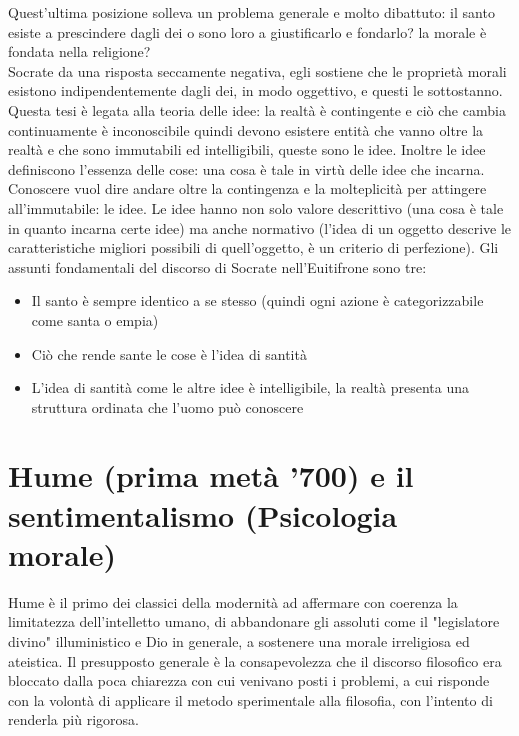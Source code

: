 \documentclass[10pt,a4paper]{article}
\begin{document}
Quest'ultima posizione solleva un problema generale e molto dibattuto: il santo esiste a prescindere dagli dei o sono loro a giustificarlo e fondarlo? la morale è fondata nella religione?\\
Socrate da una risposta seccamente negativa, egli sostiene che le proprietà morali esistono indipendentemente dagli dei, in modo oggettivo, e questi le sottostanno. Questa tesi è legata alla teoria delle idee: la realtà è contingente e ciò che cambia continuamente è inconoscibile quindi devono esistere entità che vanno oltre la realtà e che sono immutabili ed intelligibili, queste sono le idee. Inoltre le idee definiscono l'essenza delle cose: una cosa è tale in virtù delle idee che incarna. Conoscere vuol dire andare oltre la contingenza e la molteplicità per attingere all'immutabile: le idee. Le idee hanno non solo valore descrittivo (una cosa è tale in quanto incarna certe idee) ma anche normativo (l'idea di un oggetto descrive le caratteristiche migliori possibili di quell'oggetto, è un criterio di perfezione).
Gli assunti fondamentali del discorso di Socrate nell'Euitifrone sono tre:
\begin{itemize}
	\item Il santo è sempre identico a se stesso (quindi ogni azione è categorizzabile come santa o empia)
	\item Ciò che rende sante le cose è l'idea di santità
	\item L'idea di santità come le altre idee è intelligibile, la realtà presenta una struttura ordinata che l'uomo può conoscere
\end{itemize}
\newpage
\section{Hume (prima metà '700) e il sentimentalismo (Psicologia morale)}
Hume è il primo dei classici della modernità ad affermare con coerenza la limitatezza dell'intelletto umano, di abbandonare gli assoluti come il "legislatore divino" illuministico e Dio in generale, a sostenere una morale irreligiosa ed ateistica. Il presupposto generale è la consapevolezza che il discorso filosofico era bloccato dalla poca chiarezza con cui venivano posti i problemi, a cui risponde con la volontà di applicare il metodo sperimentale alla filosofia, con l'intento di renderla più rigorosa. 
\end{document}
